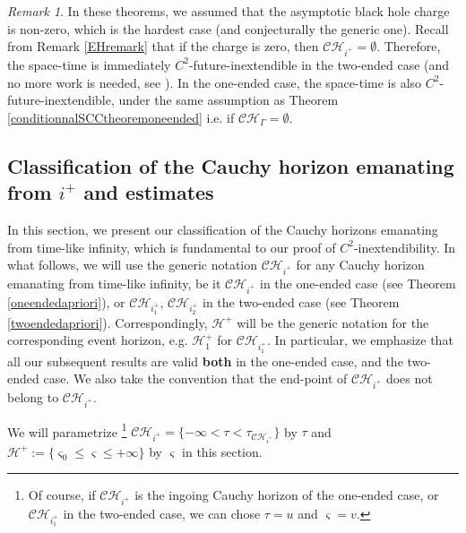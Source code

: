 \documentclass[10pt,a4paper]{article}
\theoremstyle{plain}
\theoremstyle{remark}
\newtheorem{rmk}{Remark}[section]
\theoremstyle{definition}
\newtheorem{defn}{Definition}[section]
\theoremstyle{plain}
\theoremstyle{remark}
\theoremstyle{definition}
\newcommand{\CH}{\mathcal{CH}_{i^+}}
\newcommand{\CHone}{\mathcal{CH}_{i^+_1}}
\newcommand{\CHtwo}{\mathcal{CH}_{i^+_2}}
\numberwithin{equation}{section}
\begin{document}
\begin{rmk}
	In these theorems, we assumed that the asymptotic black hole charge is non-zero, which is the hardest case (and conjecturally the generic one). Recall from Remark \ref{EHremark} that if the charge is zero, then $\CH=\emptyset$. Therefore, the space-time is immediately $C^2$-future-inextendible in the two-ended case (and no more work is needed, see \cite{MoiThesis}). In the one-ended case, the space-time is also $C^2$-future-inextendible, under the same assumption as Theorem \ref{conditionnalSCCtheoremoneended} i.e. if $\mathcal{CH}_{\Gamma}=\emptyset$.
\end{rmk}
\subsection{Classification of the Cauchy horizon emanating from $i^+$ and estimates} \label{classificationsection}


In this section, we present our classification of the Cauchy horizons emanating from time-like infinity, which is fundamental to our proof of $C^2$-inextendibility. In what follows, we will use the generic notation $\CH$ for any Cauchy horizon emanating from time-like infinity, be it $\CH$ in the one-ended case (see Theorem \ref{oneendedapriori}), or $\CHone$, $\CHtwo$ in the two-ended case (see Theorem \ref{twoendedapriori}). Correspondingly, $\mathcal{H}^+$ will be the generic notation for the corresponding event horizon, e.g. $\mathcal{H}^+_1$ for $\CHone$. In particular, we emphasize that all our subsequent results are valid \textbf{both} in the one-ended case, and the two-ended case. We also take the convention that the end-point of $\CH$ does not belong to $\CH$. 

We will parametrize \footnote{Of course, if $\CH$ is the ingoing Cauchy horizon of the one-ended case, or $\CHone$ in the two-ended case, we can chose $\tau=u$ and $\varsigma=v$.} $\CH = \{ -\infty < \tau < \tau_{\CH}\}$ by $\tau$ and $\mathcal{H}^+:= \{ \varsigma_0 \leq \varsigma \leq +\infty \}$  by $\varsigma$ in this section.
\end{document}
